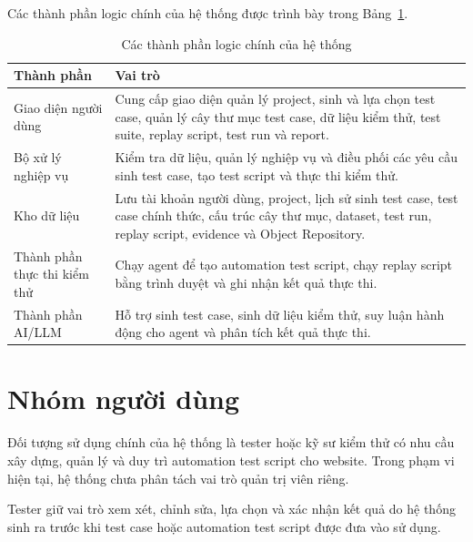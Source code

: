 Các thành phần logic chính của hệ thống được trình bày trong Bảng~\ref{tab:system_components}.

\begin{table}[H]
\centering
\caption{Các thành phần logic chính của hệ thống}
\label{tab:system_components}
\renewcommand{\arraystretch}{1.2}
\begin{tabular}{|p{4cm}|p{10cm}|}
\hline
\textbf{Thành phần} & \textbf{Vai trò} \\
\hline

Giao diện người dùng &
Cung cấp giao diện quản lý project, sinh và lựa chọn test case, quản lý cây thư mục test case, dữ liệu kiểm thử, test suite, replay script, test run và report. \\
\hline

Bộ xử lý nghiệp vụ &
Kiểm tra dữ liệu, quản lý nghiệp vụ và điều phối các yêu cầu sinh test case, tạo test script và thực thi kiểm thử. \\
\hline

Kho dữ liệu &
Lưu tài khoản người dùng, project, lịch sử sinh test case, test case chính thức, cấu trúc cây thư mục, dataset, test run, replay script, evidence và Object Repository. \\
\hline

Thành phần thực thi kiểm thử &
Chạy agent để tạo automation test script, chạy replay script bằng trình duyệt và ghi nhận kết quả thực thi. \\
\hline

Thành phần AI/LLM &
Hỗ trợ sinh test case, sinh dữ liệu kiểm thử, suy luận hành động cho agent và phân tích kết quả thực thi. \\
\hline
\end{tabular}
\end{table}

\section{Nhóm người dùng}

Đối tượng sử dụng chính của hệ thống là tester hoặc kỹ sư kiểm thử có nhu cầu xây dựng, quản lý và duy trì automation test script cho website. Trong phạm vi hiện tại, hệ thống chưa phân tách vai trò quản trị viên riêng.

Tester giữ vai trò xem xét, chỉnh sửa, lựa chọn và xác nhận kết quả do hệ thống sinh ra trước khi test case hoặc automation test script được đưa vào sử dụng.

